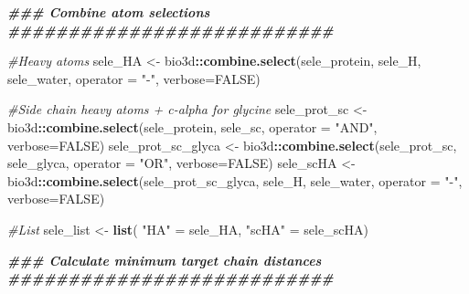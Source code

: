 \documentclass[
]{article}
\newenvironment{Shaded}{\begin{snugshade}}{\end{snugshade}}
\newcommand{\AttributeTok}[1]{\textcolor[rgb]{0.13,0.29,0.53}{#1}}
\newcommand{\CommentTok}[1]{\textcolor[rgb]{0.56,0.35,0.01}{\textit{#1}}}
\newcommand{\ConstantTok}[1]{\textcolor[rgb]{0.56,0.35,0.01}{#1}}
\newcommand{\DocumentationTok}[1]{\textcolor[rgb]{0.56,0.35,0.01}{\textbf{\textit{#1}}}}
\newcommand{\FunctionTok}[1]{\textcolor[rgb]{0.13,0.29,0.53}{\textbf{#1}}}
\newcommand{\NormalTok}[1]{#1}
\newcommand{\OtherTok}[1]{\textcolor[rgb]{0.56,0.35,0.01}{#1}}
\newcommand{\SpecialCharTok}[1]{\textcolor[rgb]{0.81,0.36,0.00}{\textbf{#1}}}
\newcommand{\StringTok}[1]{\textcolor[rgb]{0.31,0.60,0.02}{#1}}
\begin{document}
\begin{Shaded}
\begin{Highlighting}[]
  \DocumentationTok{\#\#\# Combine atom selections}
  \DocumentationTok{\#\#\#\#\#\#\#\#\#\#\#\#\#\#\#\#\#\#\#\#\#\#\#\#\#\#\#}

  \CommentTok{\#Heavy atoms}
\NormalTok{    sele\_HA }\OtherTok{\textless{}{-}}\NormalTok{ bio3d}\SpecialCharTok{::}\FunctionTok{combine.select}\NormalTok{(sele\_protein, sele\_H, sele\_water, }\AttributeTok{operator =} \StringTok{"{-}"}\NormalTok{, }\AttributeTok{verbose=}\ConstantTok{FALSE}\NormalTok{)}

  \CommentTok{\#Side chain heavy atoms + c{-}alpha for glycine}
\NormalTok{    sele\_prot\_sc }\OtherTok{\textless{}{-}}\NormalTok{ bio3d}\SpecialCharTok{::}\FunctionTok{combine.select}\NormalTok{(sele\_protein, sele\_sc, }\AttributeTok{operator =} \StringTok{"AND"}\NormalTok{, }\AttributeTok{verbose=}\ConstantTok{FALSE}\NormalTok{)}
\NormalTok{    sele\_prot\_sc\_glyca }\OtherTok{\textless{}{-}}\NormalTok{ bio3d}\SpecialCharTok{::}\FunctionTok{combine.select}\NormalTok{(sele\_prot\_sc, sele\_glyca, }\AttributeTok{operator =} \StringTok{"OR"}\NormalTok{, }\AttributeTok{verbose=}\ConstantTok{FALSE}\NormalTok{)}
\NormalTok{    sele\_scHA }\OtherTok{\textless{}{-}}\NormalTok{ bio3d}\SpecialCharTok{::}\FunctionTok{combine.select}\NormalTok{(sele\_prot\_sc\_glyca, sele\_H, sele\_water, }\AttributeTok{operator =} \StringTok{"{-}"}\NormalTok{, }\AttributeTok{verbose=}\ConstantTok{FALSE}\NormalTok{)}

    \CommentTok{\#List}
\NormalTok{    sele\_list }\OtherTok{\textless{}{-}} \FunctionTok{list}\NormalTok{(}
        \StringTok{"HA"} \OtherTok{=}\NormalTok{ sele\_HA,}
        \StringTok{"scHA"} \OtherTok{=}\NormalTok{ sele\_scHA)}

  \DocumentationTok{\#\#\# Calculate minimum target chain distances}
  \DocumentationTok{\#\#\#\#\#\#\#\#\#\#\#\#\#\#\#\#\#\#\#\#\#\#\#\#\#\#\#}


\end{Highlighting}
\end{Shaded}
\end{document}
